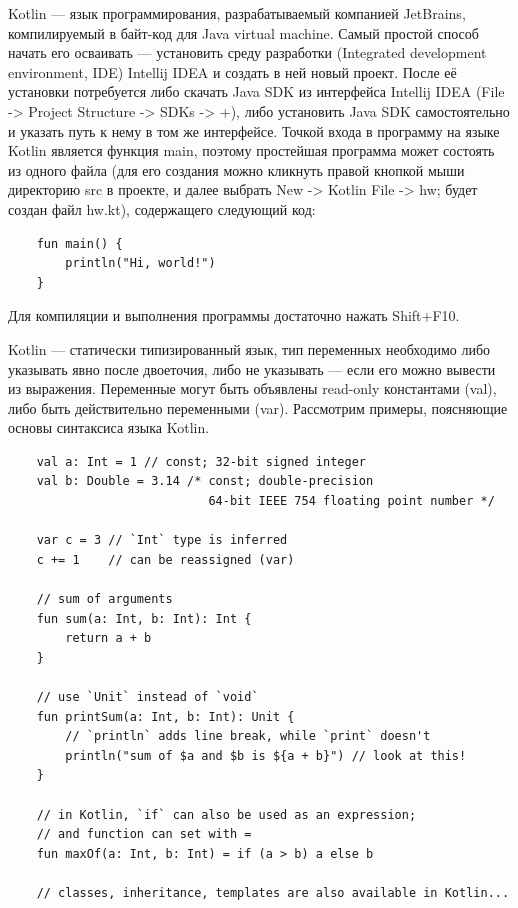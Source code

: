 \documentclass{book}
\begin{document}
Kotlin --- язык программирования, разрабатываемый компанией JetBrains, компилируемый в байт-код для
Java virtual machine. Самый простой способ начать его осваивать --- установить среду разработки
(Integrated development environment, IDE) Intellij IDEA и создать в ней новый проект. После её установки потребуется либо
скачать Java SDK из интерфейса Intellij IDEA (File -> Project Structure -> SDKs -> +), либо
установить Java SDK самостоятельно и указать путь к нему в том же интерфейсе. Точкой входа в
программу на языке Kotlin является функция main, поэтому простейшая программа может состоять из
одного файла (для его создания можно кликнуть правой кнопкой мыши директорию src в проекте, и далее
выбрать New -> Kotlin File -> hw; будет создан файл hw.kt), содержащего следующий код:
\begin{verbatim}
    fun main() {
        println("Hi, world!")
    }
\end{verbatim}
Для компиляции и выполнения программы достаточно нажать Shift+F10.

Kotlin --- статически типизированный язык, тип переменных необходимо либо указывать явно после
двоеточия, либо не указывать --- если его можно вывести из выражения. Переменные могут быть
объявлены read-only константами (val), либо быть действительно переменными (var). Рассмотрим
примеры, поясняющие основы синтаксиса языка Kotlin.
\begin{verbatim}
    val a: Int = 1 // const; 32-bit signed integer
    val b: Double = 3.14 /* const; double-precision
                            64-bit IEEE 754 floating point number */

    var c = 3 // `Int` type is inferred
    c += 1    // can be reassigned (var)

    // sum of arguments
    fun sum(a: Int, b: Int): Int {
        return a + b
    }

    // use `Unit` instead of `void`
    fun printSum(a: Int, b: Int): Unit {
        // `println` adds line break, while `print` doesn't
        println("sum of $a and $b is ${a + b}") // look at this!
    }

    // in Kotlin, `if` can also be used as an expression;
    // and function can set with =
    fun maxOf(a: Int, b: Int) = if (a > b) a else b

    // classes, inheritance, templates are also available in Kotlin...
\end{verbatim}
\end{document}
